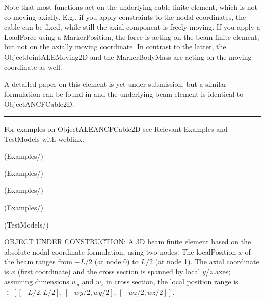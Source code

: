     Note that most functions act on the underlying cable finite element, which is not co-moving axially. E.g., if you apply constraints
    to the nodal coordinates, the cable can be fixed, while still the axial component is freely moving.
    If you apply a LoadForce using a MarkerPosition, the force is acting on the beam finite element, but not on the axially moving coordinate.
    In contrast to the latter, the ObjectJointALEMoving2D and the MarkerBodyMass are acting on the moving coordinate as well.

    A detailed paper on this element is yet under submission, but a similar formulation can be found in \cite{PechsteinGerstmayr2013ale} and 
    the underlying beam element is identical to ObjectANCFCable2D.
\vspace{6pt}\par\noindent\rule{\textwidth}{0.4pt}
%
\noindent For examples on ObjectALEANCFCable2D see Relevant Examples and TestModels with weblink:
\bi
\item {} (Examples/)
\item {} (Examples/)
\item {} (Examples/)
\item {} (Examples/)
\item {} (TestModels/)

\ei

%
\newpage


\label{sec:item:ObjectANCFBeam}
OBJECT UNDER CONSTRUCTION: A 3D beam finite element based on the absolute nodal coordinate formulation, using two nodes. The localPosition $x$ of the beam ranges from $-L/2$ (at node 0) to $L/2$ (at node 1). The axial coordinate is $x$ (first coordinate) and the cross section is spanned by local $y$/$z$ axes; assuming dimensions $w_y$ and $w_z$ in cross section, the local position range is $\in [[-L/2,L/2],\, [-wy/2,wy/2],\, [-wz/2,wz/2] ]$.
\vspace{12pt}\\

